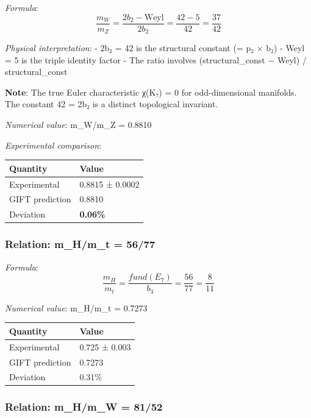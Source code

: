 \documentclass[11pt,a4paper]{article}
\begin{document}
\emph{Formula}:
\[\frac{m_W}{m_Z} = \frac{2b_2 - \text{Weyl}}{2b_2} = \frac{42 - 5}{42} = \frac{37}{42}\]

\emph{Physical interpretation}:
- 2b₂ = 42 is the structural constant (= p₂ × b₂)
- Weyl = 5 is the triple identity factor
- The ratio involves (structural\_const − Weyl) / structural\_const

\textbf{Note}: The true Euler characteristic χ(K₇) = 0 for odd-dimensional manifolds. The constant 42 = 2b₂ is a distinct topological invariant.

\emph{Numerical value}: m\_W/m\_Z = 0.8810

\emph{Experimental comparison}:

{\def\LTcaptype{none} %
\begin{longtable}[]{@{}ll@{}}
\toprule\noalign{}
Quantity & Value \\
\midrule\noalign{}
\endhead
\bottomrule\noalign{}
\endlastfoot
Experimental & 0.8815 ± 0.0002 \\
GIFT prediction & 0.8810 \\
Deviation & \textbf{0.06\%} \\
\end{longtable}
}

\subsubsection{Relation: m\_H/m\_t = 56/77}\label{relation-m_hm_t-5677}

\emph{Formula}:
\[\frac{m_H}{m_t} = \frac{fund(E_7)}{b_3} = \frac{56}{77} = \frac{8}{11}\]

\emph{Numerical value}: m\_H/m\_t = 0.7273

{\def\LTcaptype{none} %
\begin{longtable}[]{@{}ll@{}}
\toprule\noalign{}
Quantity & Value \\
\midrule\noalign{}
\endhead
\bottomrule\noalign{}
\endlastfoot
Experimental & 0.725 ± 0.003 \\
GIFT prediction & 0.7273 \\
Deviation & 0.31\% \\
\end{longtable}
}

\subsubsection{Relation: m\_H/m\_W = 81/52}\label{relation-m_hm_w-8152}
\end{document}
